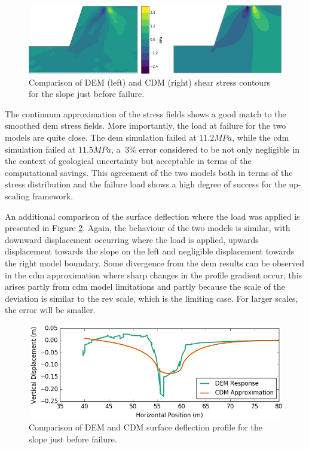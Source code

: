 \begin{figure}[!htb]
\begin{center}
\includegraphics[width=\textwidth]{figures/Chapter5/ShearStressContours}
\caption{{\label{fig:S12DNS} Comparison of DEM (left) and CDM (right) shear stress contours for the slope just before failure.%
}}
\end{center}
\end{figure}

The continuum approximation of the stress fields shows a good match to the smoothed \acrshort{dem} stress fields. More importantly, the load at failure for the two models are quite close. The \acrshort{dem} simulation failed at $11.2 MPa$, while the \acrshort{cdm} simulation failed at $11.5 MPa$, a $~3\%$ error considered to be not only negligible in the context of geological uncertainty but acceptable in terms of the computational savings. This agreement of the two models both in terms of the stress distribution and the failure load shows a high degree of success for the up-scaling framework. 

An additional comparison of the surface deflection where the load was applied is presented in Figure \ref{fig:surfacedeflection}. Again, the behaviour of the two models is similar, with downward displacement occurring where the load is applied, upwards displacement towards the slope on the left and negligible displacement towards the right model boundary. Some divergence from  the \acrshort{dem} results can be observed in the \acrshort{cdm} approximation where sharp changes in the profile gradient occur; this arises partly from \acrshort{cdm} model limitations and partly because the scale of the deviation is similar to the \acrshort{rev} scale, which is the limiting case. For larger scales, the error will be smaller.

\begin{figure}[!htb]
\begin{center}
\includegraphics[width=\textwidth]{figures/Chapter5/SurfaceDeflection}
\caption{{\label{fig:surfacedeflection} Comparison of DEM and CDM surface deflection profile for the slope just before failure.%
}}
\end{center}
\end{figure}

